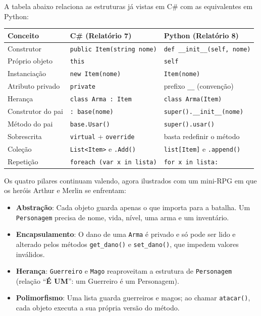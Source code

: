 A tabela abaixo relaciona as estruturas já vistas em C\# com as equivalentes em Python:

\begin{center}
\begin{tabular}{|l|l|l|}
\hline
\textbf{Conceito} & \textbf{C\# (Relatório 7)} & \textbf{Python (Relatório 8)} \\
\hline
Construtor & \texttt{public Item(string nome)} & \texttt{def \_\_init\_\_(self, nome)} \\
Próprio objeto & \texttt{this} & \texttt{self} \\
Instanciação & \texttt{new Item(nome)} & \texttt{Item(nome)} \\
Atributo privado & \texttt{private} & prefixo \texttt{\_\_} (convenção) \\
Herança & \texttt{class Arma : Item} & \texttt{class Arma(Item)} \\
Construtor do pai & \texttt{: base(nome)} & \texttt{super().\_\_init\_\_(nome)} \\
Método do pai & \texttt{base.Usar()} & \texttt{super().usar()} \\
Sobrescrita & \texttt{virtual} + \texttt{override} & basta redefinir o método \\
Coleção & \texttt{List<Item>} e \texttt{.Add()} & \texttt{list[Item]} e \texttt{.append()} \\
Repetição & \texttt{foreach (var x in lista)} & \texttt{for x in lista:} \\
\hline
\end{tabular}
\end{center}

Os quatro pilares continuam valendo, agora ilustrados com um mini-RPG em que os heróis Arthur e
Merlin se enfrentam:

\begin{itemize}
    \item \textbf{Abstração}: Cada objeto guarda apenas o que importa para a batalha. Um
    \texttt{Personagem} precisa de nome, vida, nível, uma arma e um inventário.

    \item \textbf{Encapsulamento}: O dano de uma \texttt{Arma} é privado e só pode ser lido e
    alterado pelos métodos \texttt{get\_dano()} e \texttt{set\_dano()}, que impedem valores
    inválidos.

    \item \textbf{Herança}: \texttt{Guerreiro} e \texttt{Mago} reaproveitam a estrutura de
    \texttt{Personagem} (relação ``\textbf{É UM}'': um Guerreiro é um Personagem).

    \item \textbf{Polimorfismo}: Uma lista guarda guerreiros e magos; ao chamar
    \texttt{atacar()}, cada objeto executa a sua própria versão do método.
\end{itemize}

